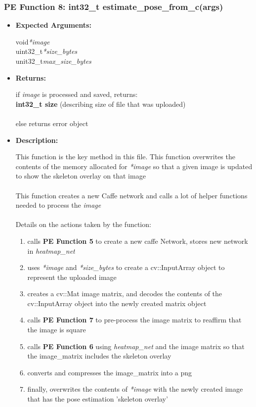 \documentclass{scrreprt}
\begin{document}
\subsubsection{PE Function 8: int32\_t estimate\_pose\_from\_c(args)}
\begin{itemize}
    \item \textbf{Expected Arguments:}

    void\quad\textit{*image}
    \\
    uint32\_t\quad\textit{*size\_bytes}
    \\
    unit32\_t\quad\textit{max\_size\_bytes}

    \item \textbf{Returns:}

    if \textit{image} is processed and saved, returns:\\\textbf{int32\_t size}
    (describing size of file that was uploaded)
    \\\\
    else returns error object

    \item \textbf{Description:}

    This function is the key method in this file. This function overwrites the contents of the memory allocated for \textit{*image} so that a given image is updated to show the skeleton overlay on that image
    \\\\
    This function creates a new Caffe network and calls a lot of helper functions needed to process the \textit{image}
    \\\\
    Details on the actions taken by the function:
    \begin{enumerate}
        \item calls \textbf{PE Function 5} to create a new caffe Network, stores new network in \textit{heatmap\_net}

        \item uses \textit{*image} and \textit{*size\_bytes} to create a cv::InputArray object to represent the uploaded image

        \item creates a cv::Mat image matrix, and decodes the contents of the cv::InputArray object into the newly created matrix object

        \item calls \textbf{PE Function 7} to pre-process the image matrix to reaffirm that the image is square

        \item calls \textbf{PE Function 6} using \textit{heatmap\_net} and the image matrix so that the image\_matrix includes the skeleton overlay

        \item converts and compresses the image\_matrix into a png

        \item finally, overwrites the contents of \textit{*image} with the newly created image that has the pose estimation 'skeleton overlay'
    \end{enumerate}

\end{itemize}
\end{document}
